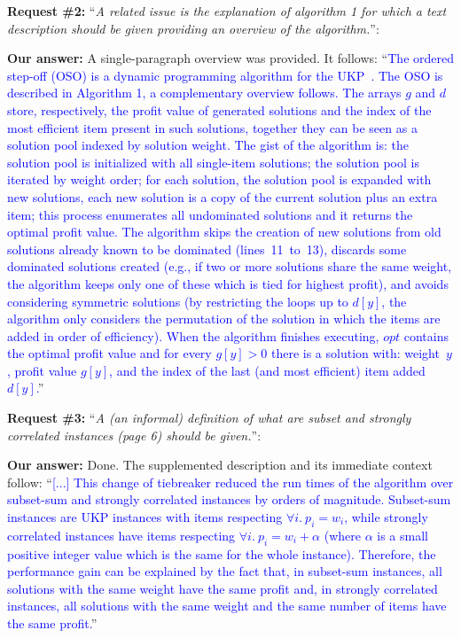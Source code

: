 \documentclass{elsarticle}
\begin{document}
\textbf{Request \#2:} ``\textit{A related issue is the explanation of algorithm 1 for which a text description should be given providing an overview of the algorithm.}'':

\textbf{Our answer:} A single-paragraph overview was provided. It follows: ``\textcolor{blue}{The ordered step-off (OSO) is a dynamic programming algorithm for the UKP~\citep{gg-66}.
The OSO is described in Algorithm 1, a complementary overview follows.
The arrays \(g\) and \(d\) store, respectively, the profit value of generated solutions and the index of the most efficient item present in such solutions, together they can be seen as a solution pool indexed by solution weight.
The gist of the algorithm is: the solution pool is initialized with all single-item solutions; the solution pool is iterated by weight order; for each solution, the solution pool is expanded with new solutions, each new solution is a copy of the current solution plus an extra item; this process enumerates all undominated solutions and it returns the optimal profit value.
The algorithm skips the creation of new solutions from old solutions already known to be dominated (lines~11~to~13), discards some dominated solutions created (e.g., if two or more solutions share the same weight, the algorithm keeps only one of these which is tied for highest profit), and avoids considering symmetric solutions (by restricting the loops up to \(d[y]\), the algorithm only considers the permutation of the solution in which the items are added in order of efficiency).
When the algorithm finishes executing, \(opt\) contains the optimal profit value and for every \(g[y] > 0\) there is a solution with: weight~\(y\), profit value \(g[y]\), and the index of the last (and most efficient) item added~\(d[y]\).}''
\medskip

\textbf{Request \#3:} ``\textit{A (an informal) definition of what are subset and strongly correlated instances (page 6) should be given.}'':

\textbf{Our answer:} Done. The supplemented description and its immediate context follow: ``\textcolor{blue}{[...] This change of tiebreaker reduced the run times of the algorithm over subset-sum and strongly correlated instances by orders of magnitude. Subset-sum instances are UKP instances with items respecting \(\forall i.~p_i = w_i\), while strongly correlated instances have items respecting \(\forall i.~p_i = w_i + \alpha\) (where \(\alpha\) is a small positive integer value which is the same for the whole instance). Therefore, the performance gain can be explained by the fact that, in subset-sum instances, all solutions with the same weight have the same profit and, in strongly correlated instances, all solutions with the same weight and the same number of items have the same profit.}''
\medskip
\end{document}
